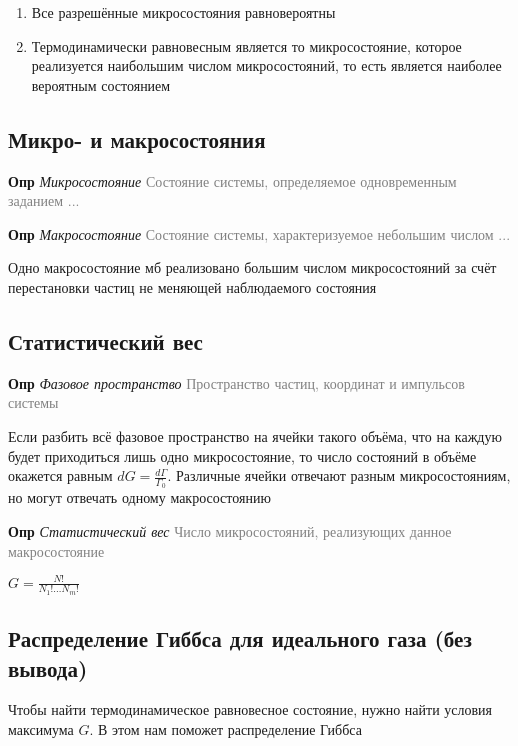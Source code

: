 \documentclass[a4paper, 14pt]{article}
\begin{document}
    \begin{enumerate}
        \item Все разрешённые микросостояния равновероятны
        \item Термодинамически равновесным является то микросостояние, которое реализуется наибольшим числом
        микросостояний, то есть является наиболее вероятным состоянием
    \end{enumerate}

    \subsection{Микро- и макросостояния}

    \textbf{Опр} \textit{Микросостояние} \textcolor{gray}{Состояние системы, определяемое одновременным заданием ...}

    \textbf{Опр} \textit{Макросостояние} \textcolor{gray}{Состояние системы, характеризуемое небольшим числом ...}

    Одно макросостояние мб реализовано большим числом микросостояний за счёт перестановки частиц не меняющей
    наблюдаемого состояния

    \subsection{Статистический вес}

    \textbf{Опр} \textit{Фазовое пространство} \textcolor{gray}{Пространство частиц, координат и импульсов системы}

    Если разбить всё фазовое пространство на ячейки такого объёма, что на каждую будет приходиться лишь одно
    микросостояние, то число состояний в объёме окажется равным $dG = \frac{d\Gamma}{\Gamma_0}$.
    Различные ячейки отвечают разным микросостояниям, но могут отвечать одному макросостоянию

    \textbf{Опр} \textit{Статистический вес} \textcolor{gray}{Число микросостояний, реализующих данное макросостояние}

    $G = \frac{N!}{N_1! \dots N_m!}$

    \subsection{Распределение Гиббса для идеального газа (без вывода)}

    Чтобы найти термодинамическое равновесное состояние, нужно найти условия максимума $G$.
    В этом нам поможет распределение Гиббса
\end{document}
